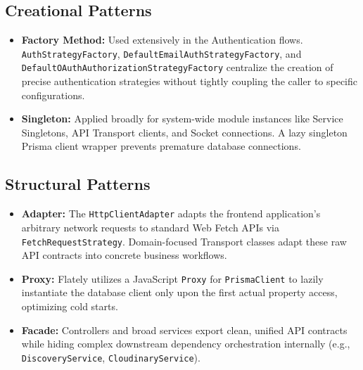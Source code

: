 \documentclass[12pt,a4paper]{article}
\begin{document}
\subsection{Creational Patterns}
\begin{itemize}[leftmargin=*]
    \item \textbf{Factory Method:} Used extensively in the Authentication flows. \texttt{AuthStrategyFactory}, \texttt{DefaultEmailAuthStrategyFactory}, and \texttt{DefaultOAuthAuthorizationStrategyFactory} centralize the creation of precise authentication strategies without tightly coupling the caller to specific configurations.
    \item \textbf{Singleton:} Applied broadly for system-wide module instances like Service Singletons, API Transport clients, and Socket connections. A lazy singleton Prisma client wrapper prevents premature database connections.
\end{itemize}

\subsection{Structural Patterns}
\begin{itemize}[leftmargin=*]
    \item \textbf{Adapter:} The \texttt{HttpClientAdapter} adapts the frontend application's arbitrary network requests to standard Web Fetch APIs via \texttt{FetchRequestStrategy}. Domain-focused Transport classes adapt these raw API contracts into concrete business workflows.
    \item \textbf{Proxy:} Flately utilizes a JavaScript \texttt{Proxy} for \texttt{PrismaClient} to lazily instantiate the database client only upon the first actual property access, optimizing cold starts.
    \item \textbf{Facade:} Controllers and broad services export clean, unified API contracts while hiding complex downstream dependency orchestration internally (e.g., \texttt{DiscoveryService}, \texttt{CloudinaryService}).
\end{itemize}
\end{document}
